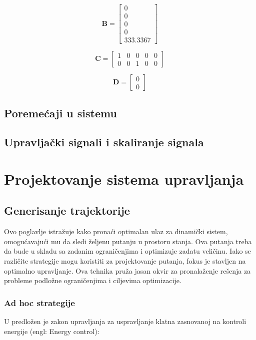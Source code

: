 \documentclass[a4paper,11pt]{article}
\theoremstyle{definition} \newtheorem{deff}{Definicija}[section]
\theoremstyle{definition} \newtheorem{prim}[deff]{Primer}
\theoremstyle{plain} \newtheorem{teor}[deff]{Teorema}
\begin{document}
	\[
	\mathbf{B} =
	\begin{bmatrix}
		0 \\
		0 \\
		0 \\
		0 \\
		333.3367
	\end{bmatrix}
	\]
	
	\[
	\mathbf{C} =
	\begin{bmatrix}
		1 & 0 & 0 & 0 & 0 \\
		0 & 0 & 1 & 0 & 0
	\end{bmatrix}
	\]
	
	\[
	\mathbf{D} =
	\begin{bmatrix}
		0 \\
		0
	\end{bmatrix}
	\]
	
	
	\clearpage
	\subsection{Poremećaji u sistemu}
	
	
	
	
	\clearpage
	\subsection{Upravljački signali i skaliranje signala}
	
	
	
	
	\newpage
	
	
	
	\section{Projektovanje sistema upravljanja}
	
	
	\newpage
	\subsection{Generisanje trajektorije}
	
	Ovo poglavlje istražuje kako pronaći optimalan ulaz za dinamički sistem, omogućavajući mu da sledi željenu putanju u prostoru stanja. Ova putanja treba da bude u skladu sa zadanim ograničenjima i optimizuje zadatu veličinu. Iako se različite strategije mogu koristiti za projektovanje putanja, fokus je stavljen na optimalno upravljanje. Ova tehnika pruža jasan okvir za pronalaženje rešenja za probleme podložne ograničenjima i ciljevima optimizacije.
	
	\subsubsection{Ad hoc strategije}
	\label{sec:andhoc}
	U \cite{energy_c} predložen je zakon upravljanja za uspravljanje klatna zasnovanoj na kontroli energije (engl: Energy control): \\
	
\end{document}
